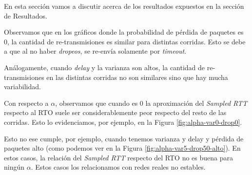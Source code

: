 
En esta sección vamos a discutir acerca de los resultados expuestos en la sección de Resultados.

Observamos que en los gráficos donde la probabilidad de pérdida de paquetes es 0, la cantidad de re-transmisiones es similar para distintas corridas. Esto se debe a que al no haber \emph{dropeos}, se re-envía solamente por \emph{timeout}.

Análogamente, cuando \emph{delay} y la varianza son altos, la cantidad de re-transmisiones en las distintas corridas no son similares sino que hay mucha variabilidad.

Con respecto a $\alpha$, observamos que cuando es 0 la aproximación del \emph{Sampled RTT} respecto al RTO suele ser considerablemente peor respecto del resto de las corridas. Esto lo evidenciamos, por ejemplo, en la Figura \ref{fig:alpha-var0-drop0}.

Esto no ese cumple, por ejemplo, cuando tenemos varianza y delay y pérdida de paquetes alto (como podemos ver en la Figura \ref{fig:alpha-var5-drop50-alto}). En estos casos, la relación del \emph{Sampled RTT} respecto del RTO no es buena para ningún $\alpha$. Estos casos los relacionamos con redes reales no estables.